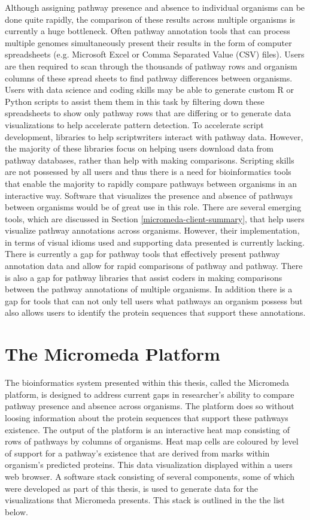 Although assigning pathway presence and absence to individual organisms can be done quite rapidly, the comparison of these results across multiple organisms is currently a huge bottleneck. Often pathway annotation tools that can process multiple genomes simultaneously present their results in the form of computer spreadsheets (e.g. Microsoft Excel or Comma Separated Value (CSV) files). Users are then required to scan through the thousands of pathway rows and organism columns of these spread sheets to find pathway differences between organisms. Users with data science and coding skills may be able to generate custom R or Python scripts to assist them them in this task by filtering down these spreadsheets to show only pathway rows that are differing or to generate data visualizations to help accelerate pattern detection. To accelerate script development, libraries to help scriptwriters interact with pathway data. However, the majority of these libraries focus on helping users download data from pathway databases, rather than help with making comparisons. Scripting skills are not possessed by all users and thus there is a need for bioinformatics tools that enable the majority to rapidly compare pathways between organisms in an interactive way. Software that visualizes the presence and absence of pathways between organisms would be of great use in this role. There are several emerging tools, which are discussed in Section \ref{micromeda-client-summary}, that help users visualize pathway annotations across organisms. However, their implementation, in terms of visual idioms used and supporting data presented is currently lacking. There is currently a gap for pathway tools that effectively present pathway annotation data and allow for rapid comparisons of pathway and pathway. There is also a gap for pathway libraries that assist coders in making comparisons between the pathway annotations of multiple organisms. In addition there is a gap for tools that can not only tell users what pathways an organism possess but also allows users to identify the protein sequences that support these annotations.

\section{The Micromeda Platform}

The bioinformatics system presented within this thesis, called the Micromeda platform, is designed to address current gaps in researcher's ability to compare pathway presence and absence across organisms. The platform does so without loosing information about the protein sequences that support these pathways existence. The output of the platform is an interactive heat map consisting of rows of pathways by columns of organisms. Heat map cells are coloured by level of support for a pathway's existence that are derived from marks within organism's predicted proteins. This data visualization displayed within a users web browser. A software stack consisting of several components, some of which were developed as part of this thesis, is used to generate data for the visualizations that Micromeda presents. This stack is outlined in the the list below.

